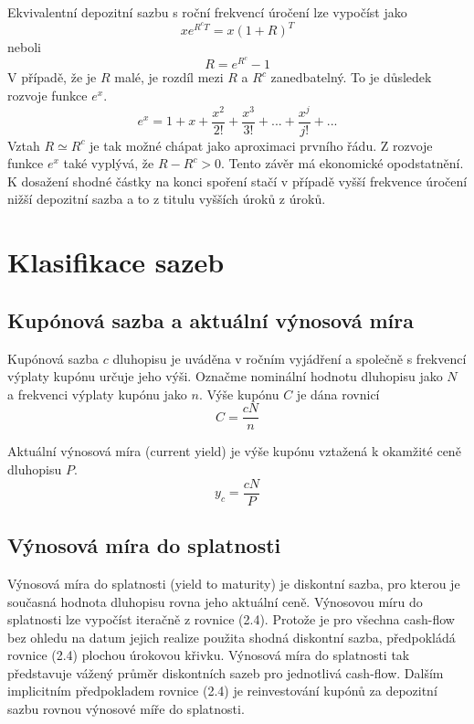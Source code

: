 \documentclass[a4paper]{book}
\begin{document}
Ekvivalentní depozitní sazbu s roční frekvencí úročení lze vypočíst jako
\begin{equation*}
xe^{R^cT} = x(1 + R)^T
\end{equation*}
neboli
\begin{equation*}
R = e^{R^c} - 1
\end{equation*}
V případě, že je $R$ malé, je rozdíl mezi $R$ a $R^c$ zanedbatelný. To je důsledek rozvoje funkce $e^x$.
\begin{equation*}
e^x = 1 + x + \frac{x^2}{2!} + \frac{x^3}{3!} + ... + \frac{x^j}{j!} + ...
\end{equation*}
Vztah $R \simeq R^c$ je tak možné chápat jako aproximaci prvního řádu. Z rozvoje funkce $e^x$ také vyplývá, že $R - R^c > 0$. Tento závěr má ekonomické opodstatnění. K dosažení shodné částky na konci spoření stačí v případě vyšší frekvence úročení nižší depozitní sazba a to z titulu vyšších úroků z úroků.

\section{Klasifikace sazeb}

\subsection{Kupónová sazba a aktuální výnosová míra}

Kupónová sazba $c$ dluhopisu je uváděna v ročním vyjádření a společně s frekvencí výplaty kupónu určuje jeho výši. Označme nominální hodnotu dluhopisu jako $N$ a frekvenci výplaty kupónu jako $n$. Výše kupónu $C$ je dána rovnicí
\begin{equation*}
C = \frac{cN}{n}
\end{equation*}

Aktuální výnosová míra (current yield) je výše kupónu vztažená k okamžité ceně dluhopisu $P$.
\begin{equation*}
y_c = \frac{cN}{P}
\end{equation*}

\subsection{Výnosová míra do splatnosti}

Výnosová míra do splatnosti (yield to maturity) je diskontní sazba, pro kterou je současná hodnota dluhopisu rovna jeho aktuální ceně. Výnosovou míru do splatnosti lze vypočíst iteračně z rovnice (2.4). Protože je pro všechna cash-flow bez ohledu na datum jejich realize použita shodná diskontní sazba, předpokládá rovnice (2.4) plochou úrokovou křivku. Výnosová míra do splatnosti tak představuje vážený průměr diskontních sazeb pro jednotlivá cash-flow. Dalším implicitním předpokladem rovnice (2.4) je reinvestování kupónů za depozitní sazbu rovnou výnosové míře do splatnosti.
\end{document}
